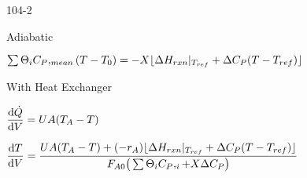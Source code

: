 \begin{mitframe}{104-2}
 \begin{listone}
	\item Adiabatic
    \item $\sum\nolimits\dimltemp_{\state}\cp,_{mean}(\Temp-\Temp_{\init})=-X\lfloor\iipf\enthalpy_{rxn}|_{\Temp_{ref}}+\iipf\cp(\Temp-\Temp_{ref})\rfloor$
\item With Heat Exchanger
\item $\dfrac{\mathrm{d}\dot{\heatflow}}{\mathrm{d}\vol}=\uvel\helmholtz(\Temp_{\helmholtz}-\Temp)$
\item $\dfrac{\mathrm{d}\Temp}{\mathrm{d}\vol}=\dfrac{\uvel\helmholtz(\Temp_{\helmholtz}-\Temp)+(-\pos_{\helmholtz})\lfloor\iipf\enthalpy_{rxn}|_{\Temp_{ref}}+\iipf\cp(\Temp-\Temp_{ref})\rfloor}{\force_{\helmholtz\init}\big(\sum\nolimits\dimltemp_{\state}\cp,_{\state}+X\iipf\cp\big)}$

\end{listone}   
\end{mitframe}
